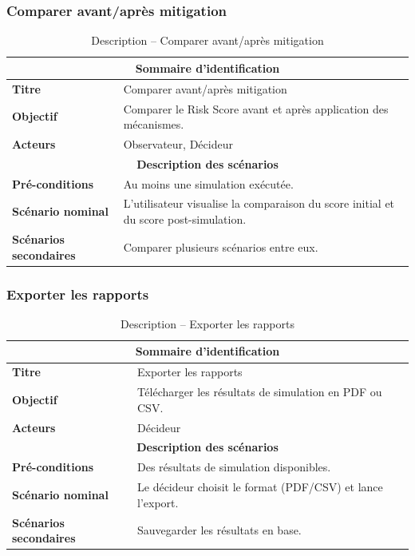 \subsubsection{Comparer avant/après mitigation}
\begin{table}[H]
\centering
\renewcommand{\arraystretch}{1.3}
\begin{tabular}{@{}p{}p{}@{}}
\hline
\multicolumn{2}{c}{\textbf{Sommaire d'identification}} \\
\hline
\textbf{Titre} & Comparer avant/après mitigation \\
\textbf{Objectif} & Comparer le Risk Score avant et après application des mécanismes. \\
\textbf{Acteurs} & Observateur, Décideur \\
\hline
\multicolumn{2}{c}{\textbf{Description des scénarios}} \\
\hline
\textbf{Pré-conditions} & Au moins une simulation exécutée. \\
\textbf{Scénario nominal} & L'utilisateur visualise la comparaison du score initial et du score post-simulation. \\
\textbf{Scénarios secondaires} & Comparer plusieurs scénarios entre eux. \\
\hline
\end{tabular}
\caption{Description -- Comparer avant/après mitigation}
\end{table}

\subsubsection{Exporter les rapports}
\begin{table}[H]
\centering
\renewcommand{\arraystretch}{1.3}
\begin{tabular}{@{}p{}p{}@{}}
\hline
\multicolumn{2}{c}{\textbf{Sommaire d'identification}} \\
\hline
\textbf{Titre} & Exporter les rapports \\
\textbf{Objectif} & Télécharger les résultats de simulation en PDF ou CSV. \\
\textbf{Acteurs} & Décideur \\
\hline
\multicolumn{2}{c}{\textbf{Description des scénarios}} \\
\hline
\textbf{Pré-conditions} & Des résultats de simulation disponibles. \\
\textbf{Scénario nominal} & Le décideur choisit le format (PDF/CSV) et lance l'export. \\
\textbf{Scénarios secondaires} & Sauvegarder les résultats en base. \\
\hline
\end{tabular}
\caption{Description -- Exporter les rapports}
\end{table}

